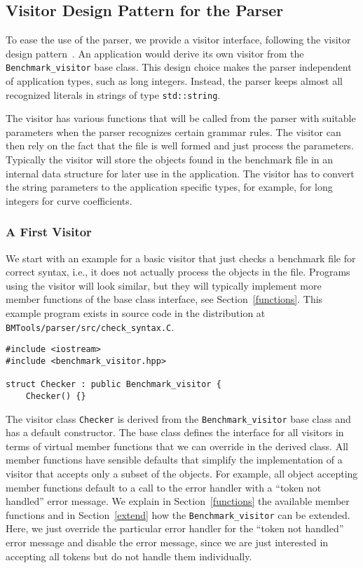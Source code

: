 \subsection{Visitor Design Pattern for the Parser}
\label{visitor}

To ease the use of the parser, we provide a visitor interface,
following the visitor design pattern~\cite{cgal:ghjv-dpero-95}.  An
application would derive its own visitor from the
\texttt{Benchmark\_visitor} base class. This design choice makes the
parser independent of application types, such as long integers.
Instead, the parser keeps almost all recognized literals in strings of
type \texttt{std::string}.

The visitor has various functions that will be called from the parser
with suitable parameters when the parser recognizes certain grammar
rules. The visitor can then rely on the fact that the file is well
formed and just process the parameters. Typically the visitor will
store the objects found in the benchmark file in an internal data
structure for later use in the application. The visitor has to convert
the string parameters to the application specific types, for example,
for long integers for curve coefficients. 

\subsubsection{A First Visitor}
\label{checker}

We start with an example for a basic visitor that just checks a
benchmark file for correct syntax, i.e., it does not actually process
the objects in the file. Programs using the visitor will look similar,
but they will typically implement more member functions of the base
class interface, see Section~\ref{functions}. This example program
exists in source code in the distribution at
\verb|BMTools/parser/src/check_syntax.C|. 

\begin{verbatim}
#include <iostream>
#include <benchmark_visitor.hpp>

struct Checker : public Benchmark_visitor {
    Checker() {}
\end{verbatim}

\noindent
The visitor class \texttt{Checker} is derived from the
\texttt{Benchmark\_visitor} base class and has a default constructor.
The base class defines the interface for all visitors in terms of
virtual member functions that we can override in the derived class.
All member functions have sensible defaults that simplify the
implementation of a visitor that accepts only a subset of the objects.
For example, all object accepting member functions default to a call
to the error handler with a ``token not handled'' error message. We
explain in Section~\ref{functions} the available member functions and
in Section~\ref{extend} how the \texttt{Benchmark\_visitor} can be
extended. Here, we just override the particular error handler for 
the ``token not handled'' error message and disable the error message,
since we are just interested in accepting all tokens but do not handle
them individually.

